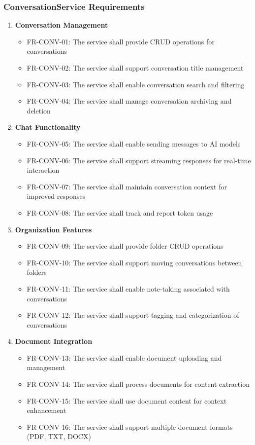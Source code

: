 \subsubsection*{ConversationService Requirements}

\begin{enumerate}
   \item \textbf{Conversation Management}
   \begin{itemize}
      \item FR-CONV-01: The service shall provide CRUD operations for conversations
      \item FR-CONV-02: The service shall support conversation title management
      \item FR-CONV-03: The service shall enable conversation search and filtering
      \item FR-CONV-04: The service shall manage conversation archiving and deletion
   \end{itemize}

   \item \textbf{Chat Functionality}
   \begin{itemize}
      \item FR-CONV-05: The service shall enable sending messages to AI models
      \item FR-CONV-06: The service shall support streaming responses for real-time interaction
      \item FR-CONV-07: The service shall maintain conversation context for improved responses
      \item FR-CONV-08: The service shall track and report token usage
   \end{itemize}

   \item \textbf{Organization Features}
   \begin{itemize}
      \item FR-CONV-09: The service shall provide folder CRUD operations
      \item FR-CONV-10: The service shall support moving conversations between folders
      \item FR-CONV-11: The service shall enable note-taking associated with conversations
      \item FR-CONV-12: The service shall support tagging and categorization of conversations
   \end{itemize}

   \item \textbf{Document Integration}
   \begin{itemize}
      \item FR-CONV-13: The service shall enable document uploading and management
      \item FR-CONV-14: The service shall process documents for content extraction
      \item FR-CONV-15: The service shall use document content for context enhancement
      \item FR-CONV-16: The service shall support multiple document formats (PDF, TXT, DOCX)
   \end{itemize}


\end{enumerate}
